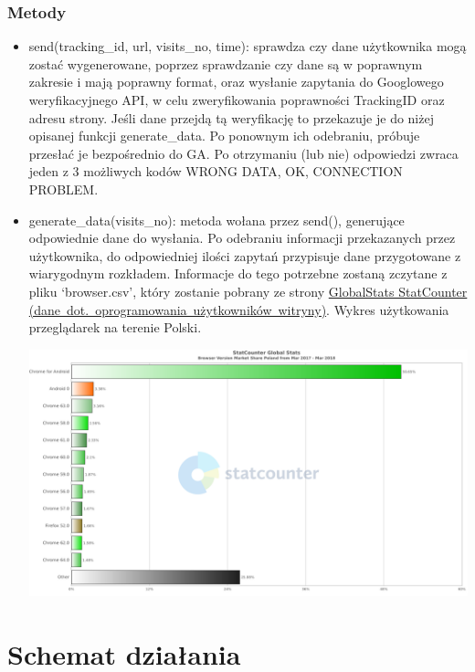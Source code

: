\documentclass{article}
\begin{document}
\subsubsection{Metody}
\begin{itemize}
\item send(tracking\_id, url, visits\_no, time): sprawdza czy dane użytkownika mogą zostać wygenerowane, poprzez sprawdzanie czy dane są w poprawnym zakresie i mają poprawny format, oraz wysłanie zapytania do Googlowego weryfikacyjnego API, w celu zweryfikowania poprawności TrackingID oraz adresu strony. Jeśli dane przejdą tą weryfikację to przekazuje je do niżej opisanej funkcji generate\_data. Po ponownym ich odebraniu, próbuje przesłać je bezpośrednio do GA\@. Po otrzymaniu (lub nie) odpowiedzi zwraca jeden z 3 możliwych kodów {WRONG DATA, OK, CONNECTION PROBLEM}.

\item generate\_data(visits\_no): metoda wołana przez send(), generujące odpowiednie dane do wysłania. Po odebraniu informacji przekazanych przez użytkownika, do odpowiedniej ilości zapytań przypisuje dane przygotowane z wiarygodnym rozkładem. Informacje do tego potrzebne zostaną zczytane z pliku `browser.csv', który zostanie pobrany ze strony \href{http://gs.statcounter.com/browser-version-market-share/all/poland#monthly-201703-201803-bar}{GlobalStats StatCounter (dane\ dot.\ oprogramowania\ użytkowników\ witryny)}. Wykres użytkowania przeglądarek na terenie Polski.

\includegraphics[scale=0.35]{chart}
\end{itemize}

\section{Schemat działania}
\end{document}
